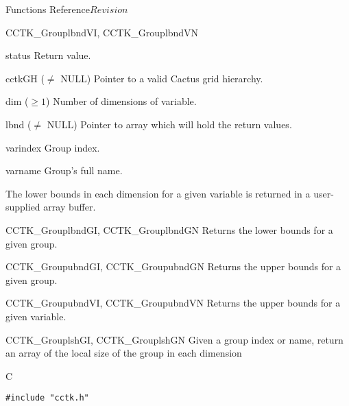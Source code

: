 \begin{cactuspart}{ Functions Reference}{}{$Revision$}
\begin{FunctionDescription}{CCTK\_GrouplbndVI, CCTK\_GrouplbndVN}
\begin{ParameterSection}
\begin{Parameter}{status} Return value. \end{Parameter}
\begin{Parameter}{cctkGH ($\ne$ NULL)} Pointer to a valid Cactus grid hierarchy. \end{Parameter}
\begin{Parameter}{dim ($\ge 1$)} Number of dimensions of variable. \end{Parameter}
\begin{Parameter}{lbnd ($\ne$ NULL)} Pointer to array which will hold the return values. \end{Parameter}
\begin{Parameter}{varindex} Group index. \end{Parameter}
\begin{Parameter}{varname} Group's full name. \end{Parameter}
\end{ParameterSection}

\begin{Discussion}
The lower bounds in each dimension for a given variable is returned in a user-supplied array buffer.
\end{Discussion}

\begin{SeeAlsoSection}
\begin{SeeAlso}{CCTK\_GrouplbndGI, CCTK\_GrouplbndGN}
Returns the lower bounds for a given group.
\end{SeeAlso}
\begin{SeeAlso}{CCTK\_GroupubndGI, CCTK\_GroupubndGN}
Returns the upper bounds for a given group.
\end{SeeAlso}
\begin{SeeAlso}{CCTK\_GroupubndVI, CCTK\_GroupubndVN}
Returns the upper bounds for a given variable.
\end{SeeAlso}
\end{SeeAlsoSection}
\end{FunctionDescription}


\begin{FunctionDescription}{CCTK\_GrouplshGI, CCTK\_GrouplshGN}
\label{CCTK-GrouplshGI}
\label{CCTK-GrouplshGN}
Given a group index or name, return an array of the local size of the group in each dimension

\begin{SynopsisSection}
\begin{Synopsis}{C}
\begin{verbatim}
#include "cctk.h"


\end{verbatim}
\end{Synopsis}
\end{SynopsisSection}
\end{FunctionDescription}
\end{cactuspart}
